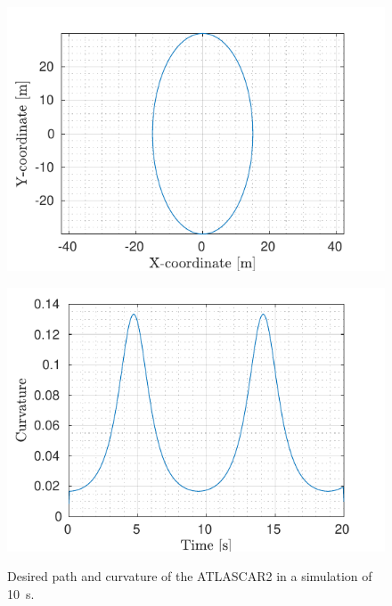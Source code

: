 \begin{figure}[!t]
	\centering
	\begin{minipage}[t]{0.49\textwidth}
		\includegraphics[width=\textwidth]{../../MATLAB/lane_following_circular_path/figure/Reference_circular.pdf}
		\subcaption{}
		\label{fig:reference_laneFollowing_circular}
	\end{minipage}
	\begin{minipage}[t]{0.49\textwidth}
		\includegraphics[width=\textwidth]{../../MATLAB/lane_following_circular_path/figure/Curvature_circular.pdf}
		\subcaption{}
		\label{fig:curvature_laneFollowing_circular}
	\end{minipage}
	\caption{Desired path and curvature of the ATLASCAR2 in a simulation of \SI{10}{s}.}
	\label{fig:laneFollowing_desired_circular}
\end{figure}

